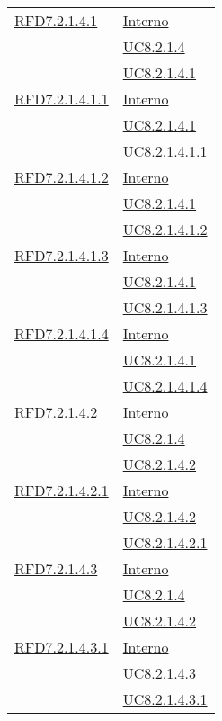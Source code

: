 \begin{longtable}{|>{\centering}m{5cm}|m{5cm}<{\centering}|}
\hyperlink{RFD7.2.1.4.1}{RFD7.2.1.4.1} & \hyperlink{Interno}{Interno}\\
& \hyperref[UC8.2.1.4]{UC8.2.1.4}\\
& \hyperref[UC8.2.1.4.1]{UC8.2.1.4.1}\\ \hline

\hyperlink{RFD7.2.1.4.1.1}{RFD7.2.1.4.1.1} & \hyperlink{Interno}{Interno}\\
& \hyperref[UC8.2.1.4.1]{UC8.2.1.4.1}\\
& \hyperref[UC8.2.1.4.1.1]{UC8.2.1.4.1.1}\\ \hline

\hyperlink{RFD7.2.1.4.1.2}{RFD7.2.1.4.1.2} & \hyperlink{Interno}{Interno}\\
& \hyperref[UC8.2.1.4.1]{UC8.2.1.4.1}\\
& \hyperref[UC8.2.1.4.1.2]{UC8.2.1.4.1.2}\\ \hline

\hyperlink{RFD7.2.1.4.1.3}{RFD7.2.1.4.1.3} & \hyperlink{Interno}{Interno}\\
& \hyperref[UC8.2.1.4.1]{UC8.2.1.4.1}\\
& \hyperref[UC8.2.1.4.1.3]{UC8.2.1.4.1.3}\\ \hline

\hyperlink{RFD7.2.1.4.1.4}{RFD7.2.1.4.1.4} & \hyperlink{Interno}{Interno}\\
& \hyperref[UC8.2.1.4.1]{UC8.2.1.4.1}\\
& \hyperref[UC8.2.1.4.1.4]{UC8.2.1.4.1.4}\\ \hline

\hyperlink{RFD7.2.1.4.2}{RFD7.2.1.4.2} & \hyperlink{Interno}{Interno}\\
& \hyperref[UC8.2.1.4]{UC8.2.1.4}\\
& \hyperref[UC8.2.1.4.2]{UC8.2.1.4.2}\\ \hline

\hyperlink{RFD7.2.1.4.2.1}{RFD7.2.1.4.2.1} & \hyperlink{Interno}{Interno}\\
& \hyperref[UC8.2.1.4.2]{UC8.2.1.4.2}\\
& \hyperref[UC8.2.1.4.2.1]{UC8.2.1.4.2.1}\\ \hline

\hyperlink{RFD7.2.1.4.3}{RFD7.2.1.4.3} & \hyperlink{Interno}{Interno}\\
& \hyperref[UC8.2.1.4]{UC8.2.1.4}\\
& \hyperref[UC8.2.1.4.2]{UC8.2.1.4.2}\\ \hline

\hyperlink{RFD7.2.1.4.3.1}{RFD7.2.1.4.3.1} & \hyperlink{Interno}{Interno}\\
& \hyperref[UC8.2.1.4.3]{UC8.2.1.4.3}\\
& \hyperref[UC8.2.1.4.3.1]{UC8.2.1.4.3.1}\\ \hline


\end{longtable}

